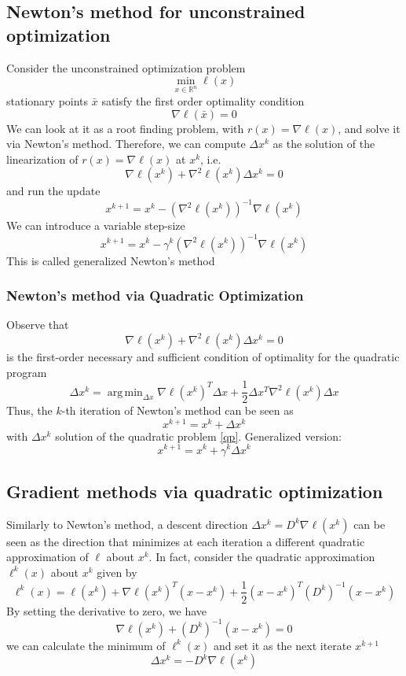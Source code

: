 \documentclass{book}
\DeclareMathOperator*{\argmin}{arg\,min}
\newcommand{\R}{\mathbb{R}}
\theoremstyle{definition}
\theoremstyle{remark}
\theoremstyle{remark}
\begin{document}
\subsection{Newton's method for unconstrained optimization}
Consider the unconstrained optimization problem 
\[
    \min_{x\in\R^n} \ell(x)
\]
stationary points $\bar{x}$ satisfy the first order optimality condition 
\[
    \nabla \ell (\bar{x}) = 0
\]
We can look at it as a root finding problem, with $r(x)=\nabla\ell(x)$, and solve it via Newton's method. Therefore, we can compute $\Delta x^k$ as the solution of the linearization of $r(x)=\nabla\ell(x)$ at $x^k$, i.e. 
\[
    \nabla \ell(x^k) + \nabla^2\ell(x^k)\Delta x^k = 0
\]
and run the update 
\[
    x^{k+1} = x^k -(\nabla^2\ell(x^k))^{-1}\nabla\ell(x^k)
\]
We can introduce a variable step-size 
\[
    x^{k+1} = x^k-\gamma^k(\nabla^2\ell(x^k))^{-1}\nabla\ell(x^k)
\]
This is called generalized Newton's method
\subsubsection{Newton's method via Quadratic Optimization}
Observe that 
\[
    \nabla\ell(x^k) +\nabla^2\ell(x^k)\Delta x^k = 0
\]
is the first-order necessary and sufficient condition of optimality for the quadratic program 
\begin{equation}
    \label{qp}
    \Delta x^k = \argmin_{\Delta x}\nabla\ell(x^k)^T \Delta x+\displaystyle\frac{1}{2}\Delta x^T\nabla^2\ell(x^k)\Delta x
\end{equation}
Thus, the $k$-th iteration of Newton's method can be seen as 
\[
    x^{k+1} = x^k+\Delta x^k
\]
with $\Delta x^k$ solution of the quadratic problem \eqref{qp}. Generalized version: 
\[
    x^{k+1} = x^k + \gamma^k \Delta x^k
\]

\subsection{Gradient methods via quadratic optimization}
Similarly to Newton's method, a descent direction $\Delta x^k=D^k\nabla\ell(x^k)$ can be seen as the direction that minimizes at each iteration a different quadratic approximation of $\ell$ about $x^k$. In fact, consider the quadratic approximation $\ell^k(x)$ about $x^k$ given by 
\[
    \ell^k(x) = \ell(x^k)+\nabla\ell(x^k)^T(x-x^k)+\displaystyle\frac{1}{2}(x-x^k)^T(D^k)^{-1}(x-x^k)
\]
By setting the derivative to zero, we have 
\[
    \nabla\ell(x^k)+(D^k)^{-1}(x-x^k)=0
\]
we can calculate the minimum of $\ell^k(x)$ and set it as the next iterate $x^{k+1}$
\[
    \Delta x^k = -D^k\nabla\ell(x^k)
\]
\end{document}
